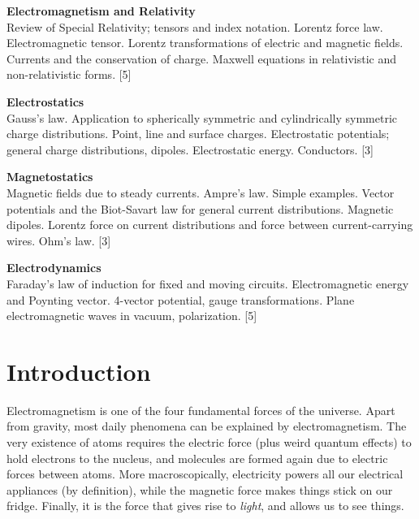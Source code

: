 \documentclass[a4paper]{article}
\begin{document}
\maketitle
{\small
\noindent\textbf{Electromagnetism and Relativity}\\
Review of Special Relativity; tensors and index notation. Lorentz force law. Electromagnetic tensor. Lorentz transformations of electric and magnetic fields. Currents and the conservation of charge. Maxwell equations in relativistic and non-relativistic forms.\hspace*{\fill} [5]

\vspace{10pt}
\noindent\textbf{Electrostatics}\\
Gauss's law. Application to spherically symmetric and cylindrically symmetric charge distributions.  Point, line and surface charges. Electrostatic potentials; general charge distributions, dipoles. Electrostatic energy. Conductors.\hspace*{\fill} [3]

\vspace{10pt}
\noindent\textbf{Magnetostatics}\\
Magnetic fields due to steady currents. Ampre's law. Simple examples. Vector potentials and the Biot-Savart law for general current distributions. Magnetic dipoles. Lorentz force on current distributions and force between current-carrying wires. Ohm's law.\hspace*{\fill} [3]

\vspace{10pt}
\noindent\textbf{Electrodynamics}\\
Faraday's law of induction for fixed and moving circuits. Electromagnetic energy and Poynting vector.  4-vector potential, gauge transformations. Plane electromagnetic waves in vacuum, polarization.\hspace*{\fill} [5]}

\tableofcontents

\setcounter{section}{-1}
\section{Introduction}
Electromagnetism is one of the four fundamental forces of the universe. Apart from gravity, most daily phenomena can be explained by electromagnetism. The very existence of atoms requires the electric force (plus weird quantum effects) to hold electrons to the nucleus, and molecules are formed again due to electric forces between atoms. More macroscopically, electricity powers all our electrical appliances (by definition), while the magnetic force makes things stick on our fridge. Finally, it is the force that gives rise to \emph{light}, and allows us to see things.
\end{document}
